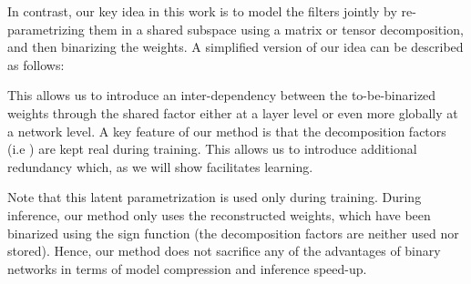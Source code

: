 \documentclass[10pt,twocolumn,letterpaper]{article}
\begin{document}
In contrast, our key idea in this work is to model the filters jointly by re-parametrizing them in a shared subspace using a matrix or tensor decomposition, and then binarizing the weights. A simplified version of our idea can be described as follows:

This allows us to introduce an inter-dependency between the to-be-binarized weights through the shared factor  either at a layer level or even more globally at a network level. A key feature of our method is that the decomposition factors (i.e ) are kept real during training. This allows us to introduce additional redundancy which, as we will show facilitates learning. 

Note that this latent parametrization is used only during training. During inference, our method only uses the reconstructed weights, which have been binarized using the sign function (the decomposition factors are neither used nor stored). Hence, our method does not sacrifice any of the advantages of binary networks in terms of model compression and inference speed-up.
\end{document}
